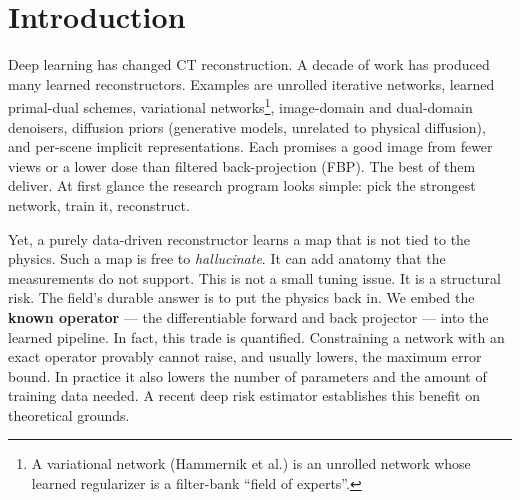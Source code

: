 \documentclass[AMA,twocolumn]{USG} %
\begin{document}
\maketitle

\section{Introduction}\label{sec:intro}

Deep learning has changed CT reconstruction. A decade of work has produced many learned reconstructors. Examples are unrolled iterative networks, learned primal-dual schemes, variational networks\footnote{A variational network (Hammernik et al.) is an unrolled network whose learned regularizer is a filter-bank ``field of experts''.}, image-domain and dual-domain denoisers, diffusion priors (generative models, unrelated to physical diffusion), and per-scene implicit representations.\cite{sidky2022,adler2018lpd,hammernik2018vn,wurfl2016deep,wuerfl2018,ongie2020} Each promises a good image from fewer views or a lower dose than filtered back-projection (FBP). The best of them deliver. At first glance the research program looks simple: pick the strongest network, train it, reconstruct.

Yet, a purely data-driven reconstructor learns a map that is not tied to the physics. Such a map is free to \emph{hallucinate}.\cite{huang2018some} It can add anatomy that the measurements do not support.\cite{maier2019gentle} This is not a small tuning issue. It is a structural risk. The field's durable answer is to put the physics back in. We embed the \textbf{known operator} --- the differentiable forward and back projector --- into the learned pipeline.\cite{maier2019knownop,maier2022review} In fact, this trade is quantified. Constraining a network with an exact operator provably cannot raise, and usually lowers, the maximum error bound. In practice it also lowers the number of parameters and the amount of training data needed.\cite{maier2019knownop} A recent deep risk estimator establishes this benefit on theoretical grounds.\cite{maier2026deep}
\end{document}

